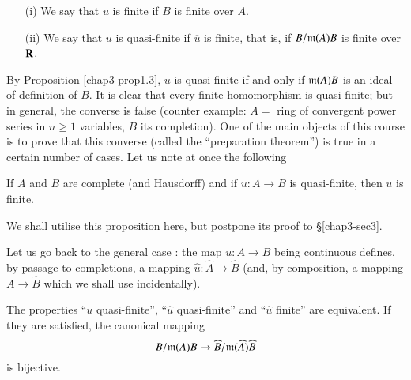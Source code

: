 \begin{definition}\label{chap3-defi1.4}
\begin{itemize}
\item[(i)] We say that $u$ is finite if $B$ is finite over $A$. 

\item[(ii)] We say that $u$ is quasi-finite if $\overline{u}$ is finite, that is, if $B/\mathfrak{m}(A)B$ is finite over $\mathbf{R}$.
\end{itemize}
\end{definition}

By Proposition \ref{chap3-prop1.3}, $u$ is quasi-finite if and only if $\mathfrak{m}(A)B$ is an ideal of definition of $B$. It is clear that every finite homomorphism is quasi-finite; but in general, the converse is false (counter example: $A=$ ring of convergent power series in $n\geq 1$ variables, $B$ its completion). One of the main objects of this course is to prove that this converse (called the ``preparation theorem'') is true in a certain number of cases. Let us note at once the following

\begin{proposition}\label{chap3-prop1.5}
If $A$ and $B$ are complete (and Hausdorff) and if $u:A\to B$ is quasi-finite, then $u$ is finite.
\end{proposition}

We shall utilise this proposition here, but postpone its proof to \S\ref{chap3-sec3}.

Let us go back to the general case : the map $u:A\to B$ being continuous defines, by passage to completions, a mapping $\widehat{u}:\widehat{A}\to \widehat{B}$ (and, by composition, a mapping $A\to \widehat{B}$ which we shall use incidentally).

\begin{proposition}\label{chap3-prop1.6}
The properties ``$u$ quasi-finite'', ``$\widehat{u}$ quasi-finite'' and ``$\widehat{u}$ finite'' are equivalent. If they are satisfied, the canonical mapping
$$
B/\mathfrak{m}(A)B\to \widehat{B}/\mathfrak{m}(\widehat{A})\widehat{B}
$$
is bijective.
\end{proposition}

